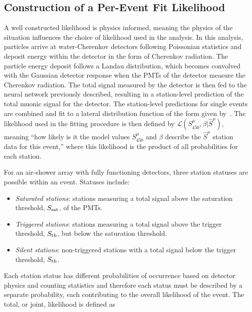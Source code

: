 

\subsection{Construction of a Per-Event Fit Likelihood}\label{ssec:likelihood}
A well constructed likelihood is physics informed, meaning the physics of the situation influences the choice of likelihood used in the analysis.
In this analysis, particles arrive at water-Cherenkov detectors following Poissonian statistics and deposit energy within the detector in the form of Cherenkov radiation.
The particle energy deposit follows a Landau distribution, which becomes convolved with the Gaussian detector response when the PMTs of the detector measure the Cherenkov radiation.
The total signal measured by the detector is then fed to the neural network previously described, resulting in a station-level prediction of the total muonic signal for the detector.
The station-level predictions for single events are combined and fit to a lateral distribution function of the form given by~.
The likelihood used in the fitting procedure is then defined by $\mathcal{L}\left(S^{\mu}_{450}, \beta|\hat{S}^{\mu}\right)$, meaning ``how likely is it the model values $S^{\mu}_{450}$ and $\beta$ describe the $\hat{S}^{\mu}$ station data for this event,'' where this likelihood is the product of all probabilities for each station.

For an air-shower array with fully functioning detectors, three station statuses are possible within an event.
Statuses include:

\begin{itemize}
  \item \textit{Saturated stations}: stations measuring a total signal above the saturation threshold, $S_{\rm sat}$, of the PMTs.
  \item \textit{Triggered stations}: stations measuring a total signal above the trigger threshold, $S_{\rm th}$, but below the saturation threshold.
  \item \textit{Silent stations}: non-triggered stations with a total signal below the trigger threshold,  $S_{\rm th}$.
\end{itemize}

\noindent
Each station status has different probabilities of occurrence based on detector physics and counting statistics and therefore each status must be described by a separate probability, each contributing to the overall likelihood of the event. 
The total, or joint, likelihood is defined as

